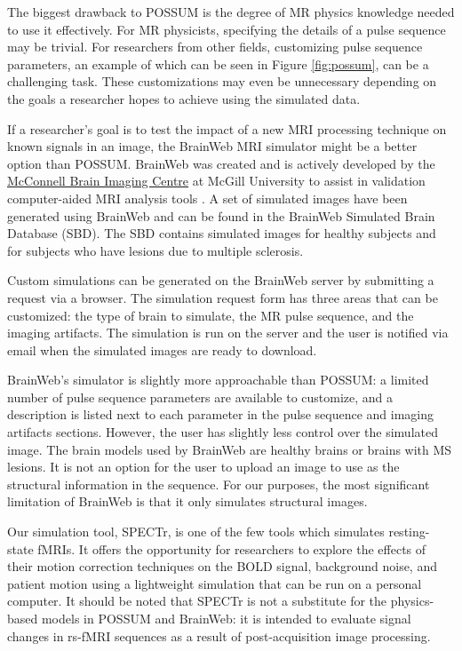 The biggest drawback to POSSUM is the degree of MR physics knowledge needed to use it effectively. For MR physicists, specifying the details of a pulse sequence may be trivial. For researchers from other fields, customizing pulse sequence parameters, an example of which can be seen in Figure \ref{fig:possum}, can be a challenging task. These customizations may even be unnecessary depending on the goals a researcher hopes to achieve using the simulated data.

If a researcher's goal is to test the impact of a new MRI processing technique on known signals in an image, the BrainWeb MRI simulator might be a better option than POSSUM. BrainWeb was created and is actively developed by the \href{mcgill.ca/bic/}{McConnell Brain Imaging Centre} at McGill University to assist in validation computer-aided MRI analysis tools \cite{kwan1999mri} \cite{collins1998design} \cite{cocosco1997brainweb} \cite{kwan1996extensible}. A set of simulated images have been generated using BrainWeb and can be found in the BrainWeb Simulated Brain Database (SBD). The SBD contains simulated images for healthy subjects and for subjects who have lesions due to multiple sclerosis.

Custom simulations can be generated on the BrainWeb server by submitting a request via a browser. The simulation request form has three areas that can be customized: the type of brain to simulate, the MR pulse sequence, and the imaging artifacts. The simulation is run on the server and the user is notified via email when the simulated images are ready to download. 

BrainWeb's simulator is slightly more approachable than POSSUM: a limited number of pulse sequence parameters are available to customize, and a description is listed next to each parameter in the pulse sequence and imaging artifacts sections. However, the user has slightly less control over the simulated image. The brain models used by BrainWeb are healthy brains or brains with MS lesions. It is not an option for the user to upload an image to use as the structural information in the sequence. For our purposes, the most significant limitation of BrainWeb is that it only simulates structural images. 

Our simulation tool, SPECTr, is one of the few tools which simulates resting-state fMRIs. It offers the opportunity for researchers to explore the effects of their motion correction techniques on the BOLD signal, background noise, and patient motion using a lightweight simulation that can be run on a personal computer. It should be noted that SPECTr is not a substitute for the physics-based models in POSSUM and BrainWeb: it is intended to evaluate signal changes in rs-fMRI sequences as a result of post-acquisition image processing.

